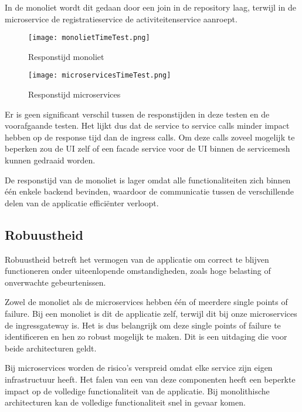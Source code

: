 In de monoliet wordt dit gedaan door een join in de repository laag, terwijl in de microservice de registratieservice de activiteitenservice aanroept.

\begin{figure}[H]
    \centering	
    \texttt{[image: monolietTimeTest.png]}
    \caption{Responstijd monoliet} 
    \label{fig:monolietTimeTest}
\end{figure}

\begin{figure}[H]
    \centering	
    \texttt{[image: microservicesTimeTest.png]}
    \caption{Responstijd microservices} 
    \label{fig:microservicesTimeTest}
\end{figure}

Er is geen significant verschil tussen de responstijden in deze testen en de voorafgaande testen. Het lijkt dus dat de service to service calls minder impact hebben op de response tijd dan de ingress calls. Om deze calls zoveel mogelijk te beperken zou de UI zelf of een facade service voor de UI binnen de servicemesh kunnen gedraaid worden.


De responstijd van de monoliet is lager omdat alle functionaliteiten zich binnen één enkele backend bevinden, waardoor de communicatie tussen de verschillende delen van de applicatie efficiënter verloopt.

\subsection{Robuustheid}

Robuustheid betreft het vermogen van de applicatie om correct te blijven functioneren onder uiteenlopende omstandigheden, zoals hoge belasting of onverwachte gebeurtenissen.

Zowel de monoliet als de microservices hebben één of meerdere single points of failure. Bij een monoliet is dit de applicatie zelf, terwijl dit bij onze microservices de ingressgateway is. Het is dus belangrijk om deze single points of failure te identificeren en hen zo robust mogelijk te maken.
Dit is een uitdaging die voor beide architecturen geldt.

Bij microservices worden de risico's verspreid omdat elke service zijn eigen infrastructuur heeft. Het falen van een van deze componenten heeft een beperkte impact op de volledige functionaliteit van de applicatie. Bij monolithische architecturen kan de volledige functionaliteit snel in gevaar komen.
